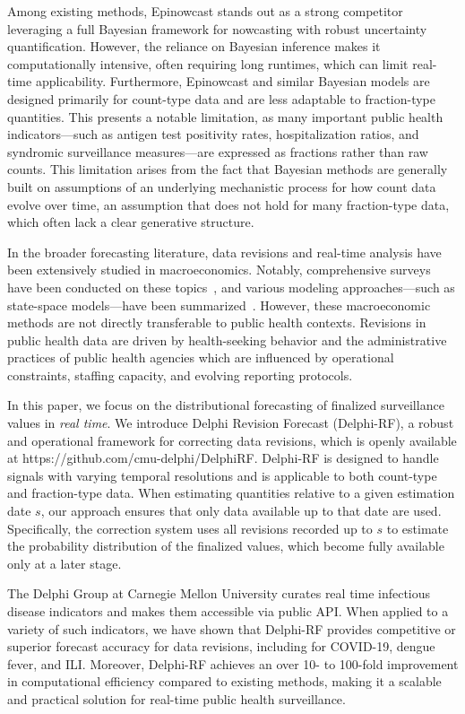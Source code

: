 Among existing methods, Epinowcast\cite{epinowcast} stands out as a strong competitor leveraging a full Bayesian framework for nowcasting with robust uncertainty quantification. However, the reliance on Bayesian inference makes it computationally intensive, often requiring long runtimes, which can limit real-time applicability. Furthermore, Epinowcast and similar Bayesian models are designed primarily for count-type data and are less adaptable to fraction-type quantities. This presents a notable limitation, as many important public health indicators—such as antigen test positivity rates, hospitalization ratios, and syndromic surveillance measures—are expressed as fractions rather than raw counts. This limitation arises from the fact that Bayesian methods are generally built on assumptions of an underlying mechanistic process for how count data evolve over time, an assumption that does not hold for many fraction-type data, which often lack a clear generative structure.

In the broader forecasting literature, data revisions and real-time analysis have been extensively studied in macroeconomics. Notably, comprehensive surveys have been conducted on these topics~\cite{croushore2006forecasting, croushore2011forecasting}, and various modeling approaches—such as state-space models—have been summarized~\cite{clements2019data}. However, these macroeconomic methods are not directly transferable to public health contexts. Revisions in public health data are driven by health-seeking behavior and the administrative practices of public health agencies which are influenced by operational constraints, staffing capacity, and evolving reporting protocols.

In this paper, we focus on the distributional forecasting of finalized surveillance values in \textit{real time}. We introduce Delphi Revision Forecast (Delphi-RF), a robust and operational framework for correcting data revisions, which is openly available at https://github.com/cmu-delphi/DelphiRF. Delphi-RF is designed to handle signals with varying temporal resolutions and is applicable to both count-type and fraction-type data. When estimating quantities relative to a given estimation date $s$, our approach ensures that only data available up to that date are used. Specifically, the correction system uses all revisions recorded up to $s$ to estimate the probability distribution of the finalized values, which become fully available only at a later stage.

The Delphi Group at Carnegie Mellon University curates real time infectious disease indicators and makes them accessible via public API\cite{reinhart2021open, mcdonald2021can, farrow2015delphi}. When applied to a variety of such indicators, we have shown that Delphi-RF provides competitive or superior forecast accuracy for data revisions, including for COVID-19, dengue fever, and ILI. Moreover, Delphi-RF achieves an over 10- to 100-fold improvement in computational efficiency compared to existing methods, making it a scalable and practical solution for real-time public health surveillance.

